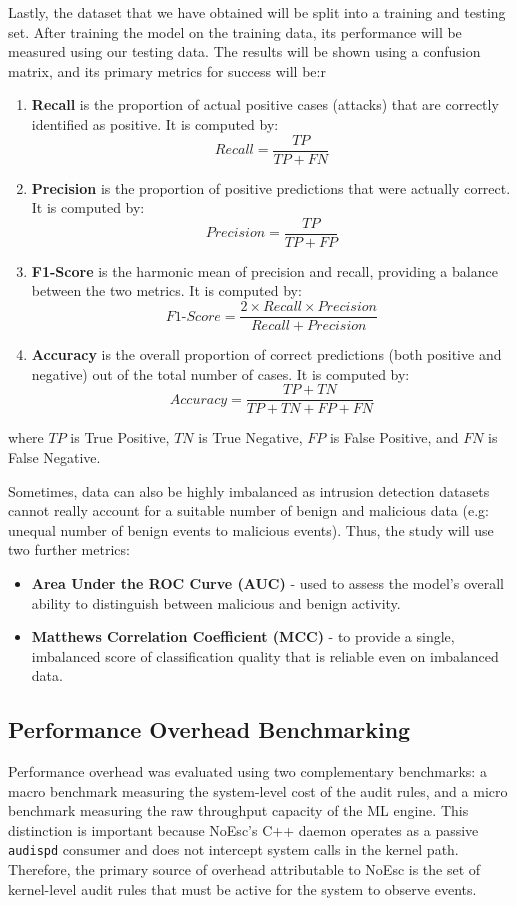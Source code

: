 \documentclass[journal]{./IEEEtran}
\begin{document}
Lastly, the dataset that we have obtained will be split into a training and testing set. After training the model on the training data, its performance will be measured using our testing data. The results will be shown using a confusion matrix, and its primary metrics for success will be:r
\begin{enumerate}
    \item \textbf{Recall} is the proportion of actual positive cases (attacks) that are correctly identified as positive. It is computed by:
    \[
    Recall = \frac{TP}{TP + FN}
    \]
    
    \item \textbf{Precision} is the proportion of positive predictions that were actually correct. It is computed by:
    \[
    Precision = \frac{TP}{TP + FP}
    \]
    
    \item \textbf{F1-Score} is the harmonic mean of precision and recall, providing a balance between the two metrics. It is computed by:
    \[
    F1\text{-}Score = \frac{2 \times Recall \times Precision}{Recall + Precision}
    \]

    \item \textbf{Accuracy} is the overall proportion of correct predictions (both positive and negative) out of the total number of cases. It is computed by:
    \[
    Accuracy = \frac{TP + TN}{TP + TN + FP + FN}
    \]

\end{enumerate}
where $TP$ is True Positive, $TN$ is True Negative, $FP$ is False Positive, and $FN$ is False Negative.

Sometimes, data can also be highly imbalanced as intrusion detection datasets cannot really account for a suitable number of benign and malicious data (e.g: unequal number of benign events to malicious events). Thus, the study will use two further metrics: 

\begin {itemize}
\item \textbf{Area Under the ROC Curve (AUC)} - used to assess the model's overall ability to distinguish between malicious and benign activity. \cite{shin2020}
\item \textbf{Matthews Correlation Coefficient (MCC)} - to provide a single, imbalanced score of classification quality that is reliable even on imbalanced data. \cite{jiang2024} 
\end{itemize}

\subsection{Performance Overhead Benchmarking}
Performance overhead was evaluated using two complementary benchmarks: a macro benchmark measuring the system-level cost of the audit rules, and a micro benchmark measuring the raw throughput capacity of the ML engine. This distinction is important because NoEsc's C++ daemon operates as a passive \texttt{audispd} consumer and does not intercept system calls in the kernel path. Therefore, the primary source of overhead attributable to NoEsc is the set of kernel-level audit rules that must be active for the system to observe events.
\end{document}
